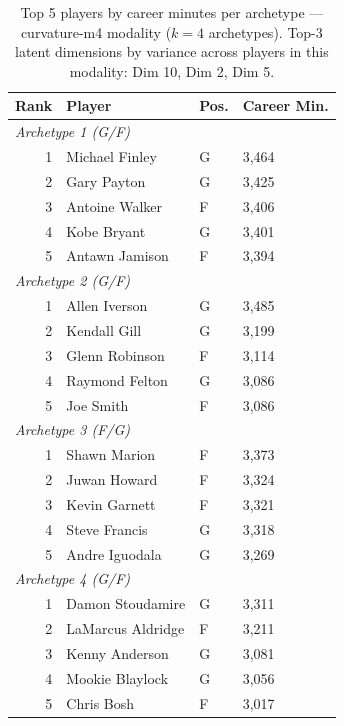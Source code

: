 \begin{table}[htbp]
  \centering\small
  \begin{tabular}{rlll}
    \toprule
    Rank & Player & Pos. & Career Min. \\
    \midrule
    \multicolumn{4}{l}{\textit{Archetype 1 (G/F)}} \\
    \midrule
    1 & Michael Finley & G & 3,464 \\
    2 & Gary Payton & G & 3,425 \\
    3 & Antoine Walker & F & 3,406 \\
    4 & Kobe Bryant & G & 3,401 \\
    5 & Antawn Jamison & F & 3,394 \\
    \midrule[0.4pt]
    \multicolumn{4}{l}{\textit{Archetype 2 (G/F)}} \\
    \midrule
    1 & Allen Iverson & G & 3,485 \\
    2 & Kendall Gill & G & 3,199 \\
    3 & Glenn Robinson & F & 3,114 \\
    4 & Raymond Felton & G & 3,086 \\
    5 & Joe Smith & F & 3,086 \\
    \midrule[0.4pt]
    \multicolumn{4}{l}{\textit{Archetype 3 (F/G)}} \\
    \midrule
    1 & Shawn Marion & F & 3,373 \\
    2 & Juwan Howard & F & 3,324 \\
    3 & Kevin Garnett & F & 3,321 \\
    4 & Steve Francis & G & 3,318 \\
    5 & Andre Iguodala & G & 3,269 \\
    \midrule[0.4pt]
    \multicolumn{4}{l}{\textit{Archetype 4 (G/F)}} \\
    \midrule
    1 & Damon Stoudamire & G & 3,311 \\
    2 & LaMarcus Aldridge & F & 3,211 \\
    3 & Kenny Anderson & G & 3,081 \\
    4 & Mookie Blaylock & G & 3,056 \\
    5 & Chris Bosh & F & 3,017 \\
    \bottomrule
  \end{tabular}
  \caption{Top 5 players by career minutes per archetype --- curvature-m4 modality ($k=4$ archetypes). Top-3 latent dimensions by variance across players in this modality: Dim 10, Dim 2, Dim 5.}
  \label{tab:arch_reps_curvature_m4}
\end{table}

